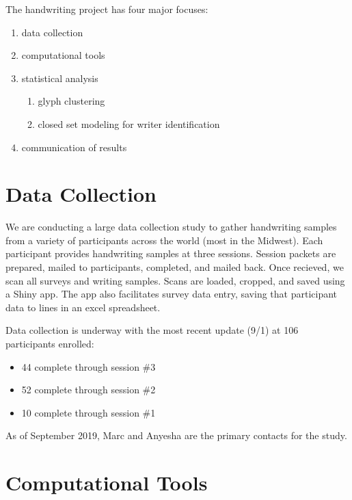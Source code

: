 \documentclass[]{book}
\providecommand{\tightlist}{%
  \setlength{\itemsep}{0pt}\setlength{\parskip}{0pt}}
\begin{document}
The handwriting project has four major focuses:

\begin{enumerate}
\def\labelenumi{\arabic{enumi}.}
\tightlist
\item
  data collection
\item
  computational tools
\item
  statistical analysis

  \begin{enumerate}
  \def\labelenumii{\alph{enumii}.}
  \tightlist
  \item
    glyph clustering
  \item
    closed set modeling for writer identification
  \end{enumerate}
\item
  communication of results
\end{enumerate}

\hypertarget{data-collection-1}{%
\section{Data Collection}\label{data-collection-1}}

We are conducting a large data collection study to gather handwriting samples from a variety of participants across the world (most in the Midwest). Each participant provides handwriting samples at three sessions. Session packets are prepared, mailed to participants, completed, and mailed back. Once recieved, we scan all surveys and writing samples. Scans are loaded, cropped, and saved using a Shiny app. The app also facilitates survey data entry, saving that participant data to lines in an excel spreadsheet.

Data collection is underway with the most recent update (9/1) at 106 participants enrolled:

\begin{itemize}
\tightlist
\item
  44 complete through session \#3
\item
  52 complete through session \#2
\item
  10 complete through session \#1
\end{itemize}

As of September 2019, Marc and Anyesha are the primary contacts for the study.

\hypertarget{computational-tools-1}{%
\section{Computational Tools}\label{computational-tools-1}}
\end{document}
